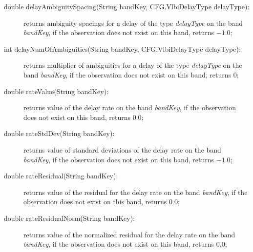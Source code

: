 \documentclass [10pt,letterpaper]{report}
\begin{document}
{{\begin{description}
\item[double delayAmbiguitySpacing(String bandKey, CFG.VlbiDelayType delayType):] returns
    ambiguity spacings for a delay of the type {\sl delayType} on the band {\sl bandKey},
    if the observation does not exist on this band, returns $-1.0$;

\item[int delayNumOfAmbiguities(String bandKey, CFG.VlbiDelayType delayType):] returns
    multiplier of ambiguities for a delay of the type {\sl delayType} on the band {\sl bandKey},
    if the observation does not exist on this band, returns $0$;

\item[double rateValue(String bandKey):] returns
    value of the delay rate on the band {\sl bandKey},
    if the observation does not exist on this band, returns $0.0$;

\item[double rateStdDev(String bandKey):] returns
    value of standard deviations of the delay rate on the band {\sl bandKey},
    if the observation does not exist on this band, returns $-1.0$;

\item[double rateResidual(String bandKey):] returns
    value of the residual for the delay rate on the band {\sl bandKey},
    if the observation does not exist on this band, returns $0.0$;

\item[double rateResidualNorm(String bandKey):] returns
    value of the normalized residual for the delay rate on the band {\sl bandKey},
    if the observation does not exist on this band, returns $0.0$;


\end{description}}}
\end{document}
